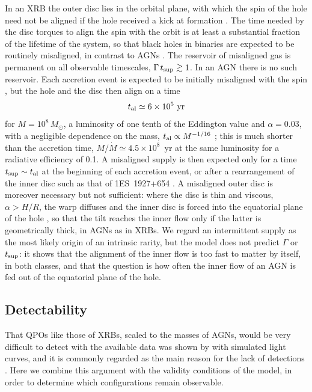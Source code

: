 In an XRB the outer disc lies in the orbital plane, with which the spin of the hole need not be aligned if the hole received a kick at formation \citep{Martin2008,King2005}.
The time needed by the disc torques to align the spin with the orbit is at least a substantial fraction of the lifetime of the system, so that black holes in binaries are expected to be routinely misaligned, in contrast to AGNs \citep{Maccarone2002,Martin2008}.
The reservoir of misaligned gas is permanent on all observable timescales, $\Gamma\,t_\textup{sup}\gtrsim1$.
In an AGN there is no such reservoir.
Each accretion event is expected to be initially misaligned with the spin \citep{King2005}, but the hole and the disc then align on a time
\begin{equation}
    \label{eq5:tNP}
    t_\textup{al}\simeq6\times10^5~\textup{yr}
\end{equation}
for $M=10^8\,M_\odot$, a luminosity of one tenth of the Eddington value and $\alpha=0.03$, with a negligible dependence on the mass, $t_\textup{al}\propto M^{-1/16}$ \citep{NatarajanPringle1998}; this is much shorter than the accretion time, $M/\dot M\simeq4.5\times10^8$~yr at the same luminosity for a radiative efficiency of 0.1.
A misaligned supply is then expected only for a time $t_\textup{sup}\sim t_\textup{al}$ at the beginning of each accretion event, or after a rearrangement of the inner disc such as that of 1ES~1927+654 \citep{Masterson2025}.
A misaligned outer disc is moreover necessary but not sufficient: where the disc is thin and viscous, $\alpha>H/R$, the warp diffuses and the inner disc is forced into the equatorial plane of the hole \citep{BPC,King2005}, so that the tilt reaches the inner flow only if the latter is geometrically thick, in AGNs as in XRBs.
We regard an intermittent supply as the most likely origin of an intrinsic rarity, but the model does not predict $\Gamma$ or $t_\textup{sup}$: it shows that the alignment of the inner flow is too fast to matter by itself, in both classes, and that the question is how often the inner flow of an AGN is fed out of the equatorial plane of the hole.

\subsection{Detectability}
\label{sec5:detect}

That QPOs like those of XRBs, scaled to the masses of AGNs, would be very difficult to detect with the available data was shown by \citet{VaughanUttley2005} with simulated light curves, and it is commonly regarded as the main reason for the lack of detections \citep[e.g.][]{Jin2020}.
Here we combine this argument with the validity conditions of the model, in order to determine which configurations remain observable.

